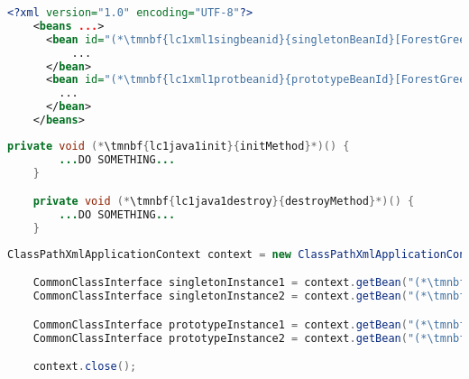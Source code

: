 \example
\begin{lstlisting}[language=XML, title={Configuration XML}]
    <?xml version="1.0" encoding="UTF-8"?>
    <beans ...>
      <bean id="(*\tmnbf{lc1xml1singbeanid}{singletonBeanId}[ForestGreen]*)" class="somepackage.subpackage.CommonClass" init-method="(*\tmnbf{lc1xml1singinit}{initMethod}[ForestGreen]*)" destroy-method="(*\tmnbf{lc1xml1singdestroy}{destroyMethod}[ForestGreen]*)">
          ...
      </bean>
      <bean id="(*\tmnbf{lc1xml1protbeanid}{prototypeBeanId}[ForestGreen]*)" class="somepackage.subpackage.CommonClass" scope="prototype" init-method="(*\tmnbf{lc1xml1protinit}{initMethod}[ForestGreen]*)" destroy-method="(*\tmnbf{lc1xml1protdestroy}{destroyMethod}[ForestGreen]*)">
        ...
      </bean>
    </beans>
\end{lstlisting}
\begin{lstlisting}[language=Java, title={Snippet of a common bean class}]
    private void (*\tmnbf{lc1java1init}{initMethod}*)() {
        ...DO SOMETHING...
    }

    private void (*\tmnbf{lc1java1destroy}{destroyMethod}*)() {
        ...DO SOMETHING...
    }
\end{lstlisting}
\begin{lstlisting}[language=Java, title={Usage}]
    ClassPathXmlApplicationContext context = new ClassPathXmlApplicationContext("configurationFile.xml");

    CommonClassInterface singletonInstance1 = context.getBean("(*\tmnbf{lc1java2singbeanid1}{singletonBeanId}[ForestGreen]*)", CommonClassInterface.class);
    CommonClassInterface singletonInstance2 = context.getBean("(*\tmnbf{lc1java2singbeanid2}{singletonBeanId}[ForestGreen]*)", CommonClassInterface.class);

    CommonClassInterface prototypeInstance1 = context.getBean("(*\tmnbf{lc1java2protbeanid1}{prototypeBeanId}[ForestGreen]*)", CommonClassInterface.class);
    CommonClassInterface prototypeInstance2 = context.getBean("(*\tmnbf{lc1java2protbeanid2}{prototypeBeanId}[ForestGreen]*)", CommonClassInterface.class);

    context.close();
\end{lstlisting}

